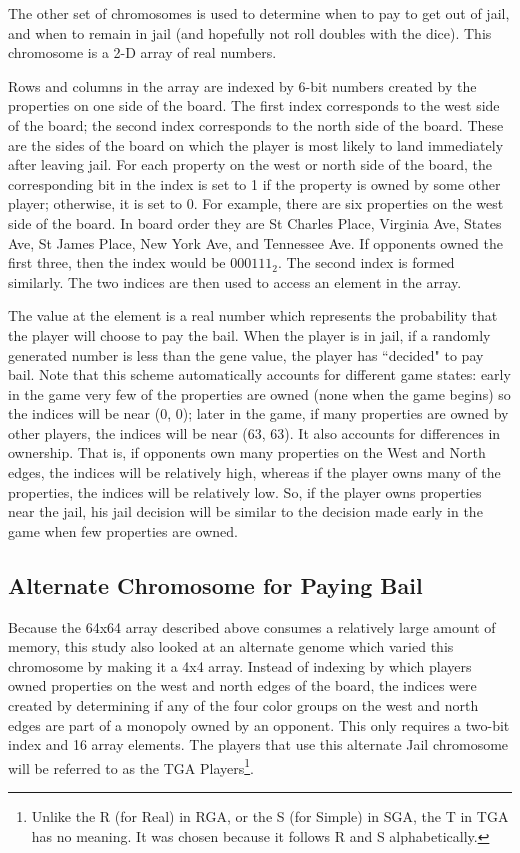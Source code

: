 The other set of chromosomes is used to determine when to pay to get out of
jail, and when to remain in jail (and hopefully not roll doubles with the dice).
This chromosome is a 2-D array of real numbers.

Rows and columns in the array are indexed by 6-bit numbers created by the
properties on one side of the board. The first index corresponds to the west
side of the board; the second index corresponds to the north side of the board.
These are the sides of the board on which the player is most likely to land
immediately after leaving jail. For each property on the west or north side of
the board, the corresponding bit in the index is set to 1 if the property is
owned by some other player; otherwise, it is set to 0. For example, there are
six properties on the west side of the board. In board order they are St Charles
Place, Virginia Ave, States Ave, St James Place, New York Ave, and Tennessee
Ave. If opponents owned the first three, then the index would be $000111_2$. The
second index is formed similarly. The two indices are then used to access an
element in the array.

The value at the element is a real number which represents the probability that the
player will choose to pay the bail. When the player is in jail, if a randomly
generated number is less than the gene value, the player has ``decided" to pay
bail. Note that this scheme automatically accounts for different game states:
early in the game very few of the properties are owned (none when the game
begins) so the indices will be near (0, 0); later in the game, if many
properties are owned by other players, the indices will be near (63, 63). It
also accounts for differences in ownership. That is, if opponents own many
properties on the West and North edges, the indices will be relatively high,
whereas if the player owns many of the properties, the indices will be
relatively low. So, if the player owns properties near the jail, his jail
decision will be similar to the decision made early in the game when few
properties are owned.

\subsection{Alternate Chromosome for Paying Bail} \label{5_altjail}

Because the 64x64 array described above consumes a relatively large amount of
memory, this study also looked at an alternate genome which varied this
chromosome by making it a 4x4 array. Instead of indexing by which players owned
properties on the west and north edges of the board, the indices were created by
determining if any of the four color groups on the west and north edges are part
of a monopoly owned by an opponent. This only requires a two-bit index and 16
array elements. The players that use this alternate Jail chromosome will be
referred to as the TGA Players\footnote{Unlike the R (for Real) in RGA, or the S
(for Simple) in SGA, the T in TGA has no meaning. It was chosen because it
follows R and S alphabetically.}.

